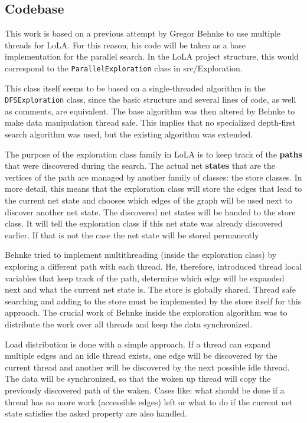 \subsection{Codebase}
\label{codeBase}
This work is based on a previous attempt by Gregor Behnke to use multiple threads for LoLA. For this reason, his code will be taken as a base implementation for the parallel search. In the LoLA project structure, this would correspond to the \texttt{ParallelExploration} class in src/Exploration.

This class itself seems to be based on a single-threaded algorithm in the \texttt{DFSExploration} class, since the basic structure and several lines of code, as well as comments, are equivalent. The base algorithm was then altered by Behnke to make data manipulation thread safe. This implies that no specialized depth-first search algorithm was used, but the existing algorithm was extended.

The purpose of the exploration class family in LoLA is to keep track of the \textbf{paths} that were discovered during the search. The actual net \textbf{states} that are the vertices of the path are managed by another family of classes: the store classes. In more detail, this means that the exploration class will store the edges that lead to the current net state and chooses which edges of the graph will be used next to discover another net state. The discovered net states will be handed to the store class. It will tell the exploration class if this net state was already discovered earlier. If that is not the case the net state will be stored permanently

Behnke tried to implement multithreading (inside the exploration class) by exploring a different path with each thread. He, therefore, introduced thread local variables that keep track of the path, determine which edge will be expanded next and what the current net state is. The store is globally shared. Thread safe searching and adding to the store must be implemented by the store itself for this approach. The crucial work of Behnke inside the exploration algorithm was to distribute the work over all threads and keep the data synchronized.

Load distribution is done with a simple approach. If a thread can expand multiple edges and an idle thread exists, one edge will be discovered by the current thread and another will be discovered by the next possible idle thread. The data will be synchronized, so that the woken up thread will copy the previously discovered path of the waken. Cases like: what should be done if a thread has no more work (accessible edges) left or what to do if the current net state satisfies the asked property are also handled.

